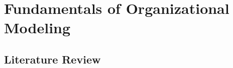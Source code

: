 \chapter{Fundamentals of Organizational Modeling}
\label{chap:fundamentals}

\section{Literature Review}
